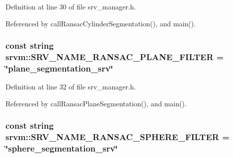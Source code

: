 Definition at line 30 of file srv\-\_\-manager.\-h.



Referenced by call\-Ransac\-Cylinder\-Segmentation(), and main().

\hypertarget{namespacesrvm_ab0f0109239fb85cfb303e5f44e4534f2}{
\subsubsection[{S\-R\-V\-\_\-\-N\-A\-M\-E\-\_\-\-R\-A\-N\-S\-A\-C\-\_\-\-P\-L\-A\-N\-E\-\_\-\-F\-I\-L\-T\-E\-R}]{\setlength{\rightskip}{0pt plus 5cm}const string srvm\-::\-S\-R\-V\-\_\-\-N\-A\-M\-E\-\_\-\-R\-A\-N\-S\-A\-C\-\_\-\-P\-L\-A\-N\-E\-\_\-\-F\-I\-L\-T\-E\-R = \char`\"{}plane\-\_\-segmentation\-\_\-srv\char`\"{}}}\label{namespacesrvm_ab0f0109239fb85cfb303e5f44e4534f2}


Definition at line 32 of file srv\-\_\-manager.\-h.



Referenced by call\-Ransac\-Plane\-Segmentation(), and main().

\hypertarget{namespacesrvm_affa682d6f49c99cbf55802194970b5e5}{
\subsubsection[{S\-R\-V\-\_\-\-N\-A\-M\-E\-\_\-\-R\-A\-N\-S\-A\-C\-\_\-\-S\-P\-H\-E\-R\-E\-\_\-\-F\-I\-L\-T\-E\-R}]{\setlength{\rightskip}{0pt plus 5cm}const string srvm\-::\-S\-R\-V\-\_\-\-N\-A\-M\-E\-\_\-\-R\-A\-N\-S\-A\-C\-\_\-\-S\-P\-H\-E\-R\-E\-\_\-\-F\-I\-L\-T\-E\-R = \char`\"{}sphere\-\_\-segmentation\-\_\-srv\char`\"{}}}\label{namespacesrvm_affa682d6f49c99cbf55802194970b5e5}


